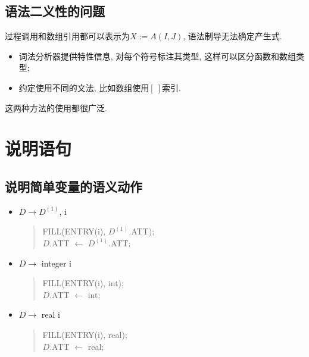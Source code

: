         \subsection{语法二义性的问题} 
        
            过程调用和数组引用都可以表示为$X:=A(I,J)$, 语法制导无法确定产生式. 
        
            \begin{itemize}
                \item 词法分析器提供特性信息, 对每个符号标注其类型, 这样可以区分函数和数组类型; 
                \item 约定使用不同的文法, 比如数组使用$[\ ]$索引.
            \end{itemize}

            这两种方法的使用都很广泛.

    \section{说明语句}

        \subsection{说明简单变量的语义动作}

            \begin{itemize}
                \item $D\to D^{(1)}$, i
                    \begin{verse}
                        FILL(ENTRY(i), $D^{(1)}$.ATT); \\
                        $D$.ATT $\gets$ $D^{(1)}$.ATT;
                    \end{verse}
                \item $D\to$ integer i
                    \begin{verse}
                        FILL(ENTRY(i), int); \\
                        $D$.ATT $\gets$ int;
                    \end{verse}
                \item $D\to$ real i
                    \begin{verse}
                        FILL(ENTRY(i), real); \\
                        $D$.ATT $\gets$ real;
                    \end{verse}
            \end{itemize}

